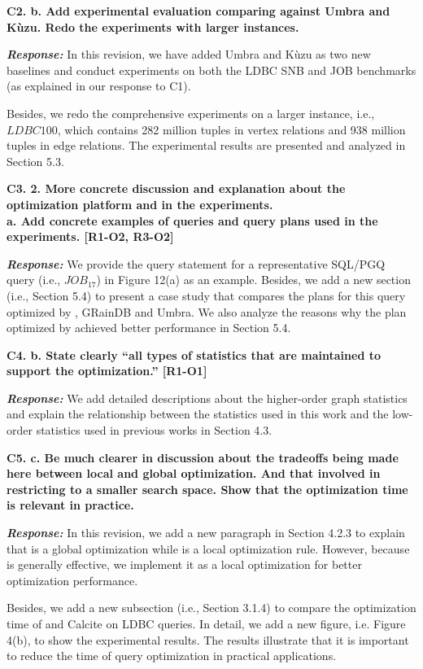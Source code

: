 \textbf{C2. b. Add experimental evaluation comparing against Umbra and Kùzu. Redo the experiments with larger instances.}

\textbf{\textit{Response: }}
In this revision, we have added Umbra and K\`uzu as two new baselines and conduct experiments on both the LDBC SNB and JOB benchmarks (as explained in our response to C1).


Besides, we redo the comprehensive experiments on a larger instance, i.e., $LDBC100$, which contains 282 million tuples in vertex relations and 938 million tuples in edge relations.
The experimental results are presented and analyzed in Section 5.3.


\textbf{
C3. 2. More concrete discussion and explanation about the optimization platform and in the experiments. \\
a. Add concrete examples of queries and query plans used in the experiments. [R1-O2, R3-O2]
}

\textbf{\textit{Response: }}
We provide the query statement for a representative SQL/PGQ query (i.e., $JOB_{17}$) in Figure 12(a) as an example.
Besides, we add a new section (i.e., Section 5.4) to present a case study that compares the plans for this query optimized by \name, GRainDB and Umbra.
We also analyze the reasons why the plan optimized by \name achieved better performance in Section 5.4.


\textbf{
C4. b. State clearly “all types of statistics that are maintained to support the optimization.” [R1-O1]}

\textbf{\textit{Response: }}
We add detailed descriptions about the higher-order graph statistics and explain the relationship between the statistics used in this work and the low-order statistics used in previous works in Section 4.3.


\textbf{
C5. c. Be much clearer in discussion about the tradeoffs being made here between local and global optimization. And that involved in restricting to a smaller search space. Show that the optimization time is relevant in practice.}

\textbf{\textit{Response: }} 
In this revision, we add a new paragraph in Section 4.2.3 to explain that \filterrule is a global optimization while \fusionrule is a local optimization rule.
However, because \filterrule is generally effective, we implement it as a local optimization for better optimization performance.

Besides, we add a new subsection (i.e., Section 3.1.4) to compare the optimization time of \name and Calcite on LDBC queries.
In detail, we add a new figure, i.e. Figure 4(b), to show the experimental results.
The results illustrate that it is important to reduce the time of query optimization in practical applications. 



